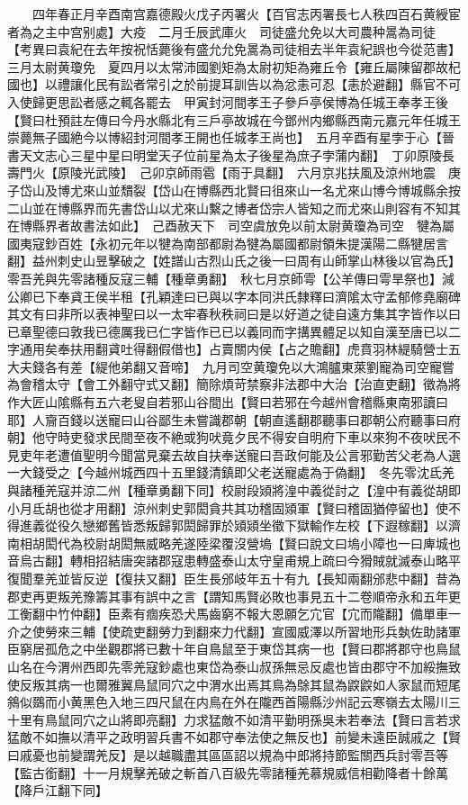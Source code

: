 　　四年春正月辛酉南宫嘉德殿火戊子丙署火【百官志丙署長七人秩四百石黄綬宦者為之主中宫别處】大疫　二月壬辰武庫火　司徒盛允免以大司農种暠為司徒　【考異曰袁紀在去年按祝恬薨後有盛允允免暠為司徒相去半年袁紀誤也今從范書】　三月太尉黄瓊免　夏四月以太常沛國劉矩為太尉初矩為雍丘令【雍丘屬陳留郡故杞國也】以禮讓化民有訟者常引之於前提耳訓告以為忿恚可忍【恚於避翻】縣官不可入使歸更思訟者感之輒各罷去　甲寅封河間孝王子參戶亭侯博為任城王奉孝王後【賢曰杜預註左傳曰今丹水縣北有三戶亭故城在今鄧州内鄉縣西南元嘉元年任城王崇薨無子國絶今以博紹封河間孝王開也任城孝王尚也】　五月辛酉有星孛于心【晉書天文志心三星中星曰明堂天子位前星為太子後星為庶子孛蒲内翻】　丁卯原陵長壽門火【原陵光武陵】　己卯京師雨雹【雨于具翻】　六月京兆扶風及涼州地震　庚子岱山及博尤來山並穨裂【岱山在博縣西北賢曰徂來山一名尤來山博今博城縣余按二山並在博縣界而先書岱山以尤來山繫之博者岱宗人皆知之而尤來山則容有不知其在博縣界者故書法如此】　己酉赦天下　司空虞放免以前太尉黄瓊為司空　犍為屬國夷寇鈔百姓【永初元年以犍為南部都尉為犍為屬國都尉領朱提漢陽二縣犍居言翻】益州刺史山昱擊破之【姓譜山古烈山氏之後一曰周有山師掌山林後以官為氏】　零吾羌與先零諸種反寇三輔【種章勇翻】　秋七月京師雩【公羊傳曰雩旱祭也】減公卿已下奉貣王侯半租【孔穎達曰已與以字本同洪氏隸釋曰濟隂太守孟郁修堯廟碑其文有曰非所以表神聖曰以一太牢春秋秩祠曰是以好道之徒自遠方集其字皆作以曰已章聖德曰敦我已德厲我已仁字皆作已已以義同而字搆異體足以知自漢至唐已以二字通用矣奉扶用翻貣吐得翻假借也】占賣關内侯【占之贍翻】虎賁羽林緹騎營士五大夫錢各有差【緹他弟翻又音啼】　九月司空黄瓊免以大鴻臚東萊劉寵為司空寵嘗為會稽太守【會工外翻守式又翻】簡除煩苛禁察非法郡中大治【治直吏翻】徵為將作大匠山隂縣有五六老叟自若邪山谷間出【賢曰若邪在今越州會稽縣東南邪讀曰耶】人齎百錢以送寵曰山谷鄙生未嘗識郡朝【朝直遙翻郡聽事曰郡朝公府聽事曰府朝】他守時吏發求民間至夜不絶或狗吠竟夕民不得安自明府下車以來狗不夜吠民不見吏年老遭值聖明今聞當見棄去故自扶奉送寵曰吾政何能及公言邪勤苦父老為人選一大錢受之【今越州城西四十五里錢清鎮即父老送寵處為于偽翻】　冬先零沈氐羌與諸種羌寇并涼二州【種章勇翻下同】校尉段熲將湟中義從討之【湟中有義從胡即小月氐胡也從才用翻】涼州刺史郭閎貪共其功稽固熲軍【賢曰稽固猶停留也】使不得進義從役久戀鄉舊皆悉叛歸郭閎歸罪於熲熲坐徵下獄輸作左校【下遐稼翻】以濟南相胡閎代為校尉胡閎無威略羌遂陸梁覆沒營塢【賢曰說文曰塢小障也一曰庳城也音烏古翻】轉相招結唐突諸郡寇患轉盛泰山太守皇甫規上疏曰今猾賊就滅泰山略平復聞羣羌並皆反逆【復扶又翻】臣生長邠岐年五十有九【長知兩翻邠悲中翻】昔為郡吏再更叛羌豫籌其事有誤中之言【謂知馬賢必敗也事見五十二卷順帝永和五年更工衡翻中竹仲翻】臣素有痼疾恐犬馬齒窮不報大恩願乞宂官【宂而隴翻】備單車一介之使勞來三輔【使疏吏翻勞力到翻來力代翻】宣國威澤以所習地形兵埶佐助諸軍臣窮居孤危之中坐觀郡將已數十年自鳥鼠至于東岱其病一也【賢曰郡將郡守也鳥鼠山名在今渭州西即先零羌寇鈔處也東岱為泰山叔孫無忌反處也皆由郡守不加綏撫致使反叛其病一也爾雅翼鳥鼠同穴之中渭水出焉其鳥為鵌其鼠為鼵鼵如人家鼠而短尾䳜似鵽而小黄黑色入地三四尺鼠在内鳥在外在隴西首陽縣沙州記云寒嶺去太陽川三十里有鳥鼠同穴之山將即亮翻】力求猛敵不如清平勤明孫吳未若奉法【賢曰言若求猛敵不如撫以清平之政明習兵書不如郡守奉法使之無反也】前變未遠臣誠戚之【賢曰戚憂也前變謂羌反】是以越職盡其區區詔以規為中郎將持節監關西兵討零吾等【監古銜翻】十一月規擊羌破之斬首八百級先零諸種羌慕規威信相勸降者十餘萬【降戶江翻下同】

